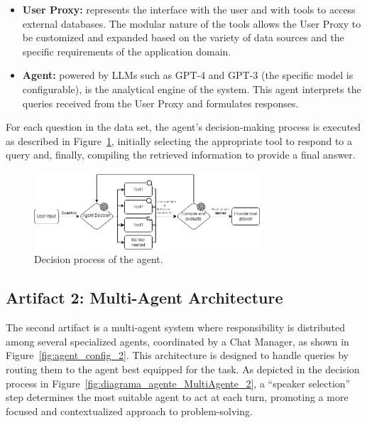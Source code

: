             \begin{itemize}        
                        
                \item \textbf{User Proxy:} represents the interface with the user and with tools to access external databases. The modular nature of the tools allows the User Proxy to be customized and expanded based on the variety of data sources and the specific requirements of the application domain.

                \item \textbf{Agent:} powered by LLMs such as GPT-4 and GPT-3 (the specific model is configurable), is the analytical engine of the system. This agent interprets the queries received from the User Proxy and formulates responses.
                                    
            \end{itemize}

            
            For each question in the data set, the agent's decision-making process is executed as described in Figure~\ref{fig:diagrama_agente_1}, initially selecting the appropriate tool to respond to a query and, finally, compiling the retrieved information to provide a final answer.

            \begin{figure}[h]
                \centering
                \includegraphics[width=0.75\textwidth]{images/agent_diagram_1.png}
                \caption{Decision process of the agent.}
                \label{fig:diagrama_agente_1}
            \end{figure}

        \subsection{Artifact 2: Multi-Agent Architecture}

            The second artifact is a multi-agent system where responsibility is distributed among several specialized agents, coordinated by a Chat Manager, as shown in Figure~\ref{fig:agent_config_2}. This architecture is designed to handle queries by routing them to the agent best equipped for the task. As depicted in the decision process in Figure~\ref{fig:diagrama_agente_MultiAgente_2}, a \enquote{speaker selection} step determines the most suitable agent to act at each turn, promoting a more focused and contextualized approach to problem-solving.


